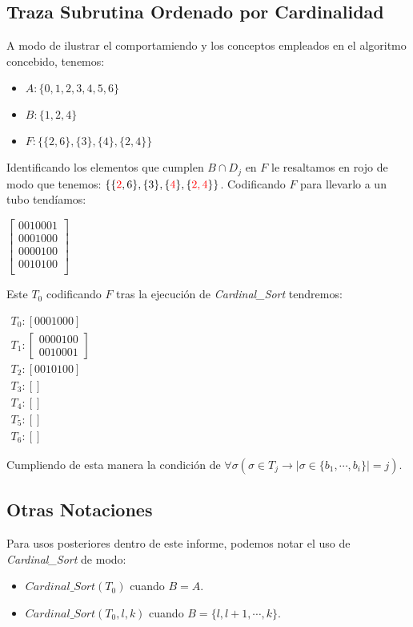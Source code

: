 \documentclass[12pt, letterpaper, twoside]{article}
\begin{document}
    \newpage

    \subsection{Traza Subrutina Ordenado por Cardinalidad}
    A modo de ilustrar el comportamiendo y los conceptos empleados en el algoritmo concebido, tenemos:
    \begin{itemize}
        \item $A: \{0, 1, 2, 3, 4, 5, 6\}$
        \item $B: \{1, 2, 4\}$
        \item $F: \{\{2, 6\}, \{3\}, \{4\}, \{2, 4\}\}$
    \end{itemize}
    Identificando los elementos que cumplen $B\cap D_j$ en $F$ le resaltamos en rojo de modo que tenemos: $\{\{\textcolor{red}{2}, 6\}, \{3\}, \{\textcolor{red}{4}\}, \{\textcolor{red}{2, 4}\}\}$. Codificando $F$ para llevarlo a un tubo tendíamos: 


    $
        \begin{bmatrix}
            0 0 1 0 0 0 1 \\
            0 0 0 1 0 0 0 \\
            0 0 0 0 1 0 0 \\
            0 0 1 0 1 0 0 \\
        \end{bmatrix}
    $ 


Este $T_0$ codificando $F$ tras la ejecución de \emph{Cardinal\_Sort} tendremos: 

    $
    \begin{array}{l}
        T_0: [ 0 0 0 1 0 0 0 ] \\
        T_1: \left[ \begin{array}{l} 0 0 0 0 1 0 0 \\ 0 0 1 0 0 0 1 \end{array} \right] \\
        T_2: [0 0 1 0 1 0 0] \\
        T_3: [] \\
        T_4: [] \\
        T_5: [] \\
        T_6: [] 
    \end{array}
    $ 


Cumpliendo de esta manera la condición de $\forall\sigma(\sigma\in T_j \rightarrow|\sigma\in\{b_1,\cdots,b_i\}|=j)$.

    \subsection{Otras Notaciones}
    Para usos posteriores dentro de este informe, podemos notar el uso de \emph{Cardinal\_Sort} de modo:
    \begin{itemize}
        \item $Cardinal\_Sort(T_0)$ cuando $B=A$.
        \item $Cardinal\_Sort(T_0, l, k)$ cuando $B=\{l, l+1,\cdots,k\}$.
    \end{itemize}
    \newpage
\end{document}
